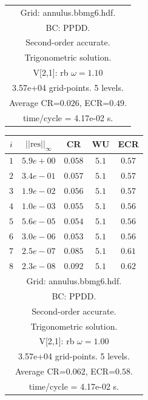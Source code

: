 \begin{table}[hbt]
\begin{center}
{\begin{tabular}{|c|c|c|c|c|}
\hline 
\multicolumn{5}{|c|}{Grid: annulus.bbmg6.hdf.}  \\
\multicolumn{5}{|c|}{BC: PPDD.}  \\
\multicolumn{5}{|c|}{Second-order accurate.}  \\
\multicolumn{5}{|c|}{Trigonometric solution.}  \\
\multicolumn{5}{|c|}{V[2,1]: rb $\omega=1.10$}  \\
\multicolumn{5}{|c|}{3.57e+04 grid-points. 5 levels.}  \\
\multicolumn{5}{|c|}{Average CR=$0.026$, ECR=$0.49$.}  \\
\multicolumn{5}{|c|}{time/cycle = 4.17e-02 s.}  \\
\hline 
\end{tabular}
\begin{tabular}{|c|c|c|c|c|} \hline 
 $i$   & $\vert\vert\mbox{res}\vert\vert_\infty$  &  CR     &  WU    & ECR  \\   \hline 
 $ 1$  & $ 5.9e+00$ & $0.058$ & $ 5.1$ & $0.57$ \\ 
 $ 2$  & $ 3.4e-01$ & $0.057$ & $ 5.1$ & $0.57$ \\ 
 $ 3$  & $ 1.9e-02$ & $0.056$ & $ 5.1$ & $0.57$ \\ 
 $ 4$  & $ 1.0e-03$ & $0.055$ & $ 5.1$ & $0.56$ \\ 
 $ 5$  & $ 5.6e-05$ & $0.054$ & $ 5.1$ & $0.56$ \\ 
 $ 6$  & $ 3.0e-06$ & $0.053$ & $ 5.1$ & $0.56$ \\ 
 $ 7$  & $ 2.5e-07$ & $0.085$ & $ 5.1$ & $0.61$ \\ 
 $ 8$  & $ 2.3e-08$ & $0.092$ & $ 5.1$ & $0.62$ \\ 
\hline 
\multicolumn{5}{|c|}{Grid: annulus.bbmg6.hdf.}  \\
\multicolumn{5}{|c|}{BC: PPDD.}  \\
\multicolumn{5}{|c|}{Second-order accurate.}  \\
\multicolumn{5}{|c|}{Trigonometric solution.}  \\
\multicolumn{5}{|c|}{V[2,1]: rb $\omega=1.00$}  \\
\multicolumn{5}{|c|}{3.57e+04 grid-points. 5 levels.}  \\
\multicolumn{5}{|c|}{Average CR=$0.062$, ECR=$0.58$.}  \\
\multicolumn{5}{|c|}{time/cycle = 4.17e-02 s.}  \\
\hline 
\end{tabular}
}
\end{center}
\end{table}

